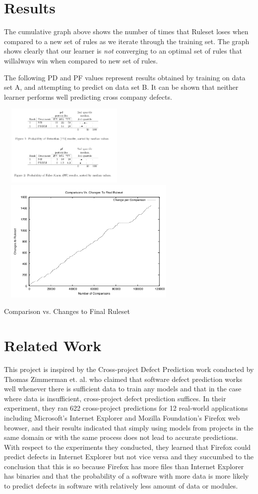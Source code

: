 \documentclass{sig-alternate}
\begin{document}
\section{Results}
The cumulative graph above shows the number of times that Ruleset loses when compared to a new set of rules as we iterate through the training set. The graph shows clearly that our learner is {\em not} converging to an optimal set of rules that willalways win when compared to new set of rules.

The following PD and PF values represent results obtained by training on data set A, and attempting to predict on data set B. It can be shown that neither learner performs well predicting cross company defects.

\includegraphics[width=243px, height=149px]{pd.png}
\includegraphics[width=90mm, height=60mm]{iter.png}

\caption{Comparison vs. Changes to Final Ruleset}


\section{Related Work}
This project is inspired by the Cross-project Defect Prediction work conducted by Thomas Zimmerman et. al. who claimed that software defect prediction works well whenever there is sufficient data to train any models and that in the case where data is insufficient, cross-project defect prediction suffices\cite{zimmerman09}. In their experiment, they ran 622 cross-project predictions for 12 real-world applications including Microsoft's Internet Explorer and Mozilla Foundation's Firefox web browser, and their results indicated that simply using models from projects in the same domain or with the same process does not lead to accurate predictions. With respect to the experiments they conducted, they learned that Firefox could predict defects in Internet Explorer but not vice versa and they succumbed to the conclusion that this is so because Firefox has more files than Internet Explorer has binaries and that the probability of a software with more data is more likely to predict defects in software with relatively less amount of data or modules.
\end{document}
